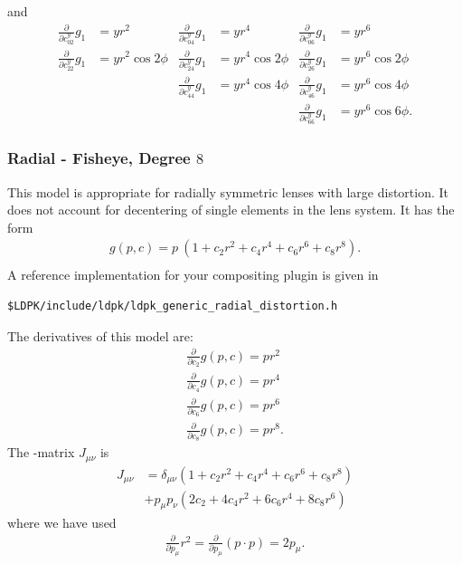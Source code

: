\documentclass[10pt,a4paper]{article}
\begin{document}
and
\begin{align}
\frac \partial {\partial c^y_{02}} g_1 &= y r^2 &
\frac \partial {\partial c^y_{04}} g_1 &= y r^4 &
\frac \partial {\partial c^y_{06}} g_1 &= y r^6 \nonumber\\
\frac \partial {\partial c^y_{22}} g_1 &= y r^2 \cos{2\phi} &
\frac \partial {\partial c^y_{24}} g_1 &= y r^4 \cos{2\phi} &
\frac \partial {\partial c^y_{26}} g_1 &= y r^6 \cos{2\phi} \nonumber\\
& & \frac \partial {\partial c^y_{44}} g_1 &= y r^4 \cos{4\phi} &
\frac \partial {\partial c^y_{46}} g_1 &= y r^6 \cos{4\phi} \nonumber\\
& & & & \frac \partial {\partial c^y_{66}} g_1 &= y r^6 \cos{6\phi}.
\end{align}

\subsubsection{Radial - Fisheye, Degree $8$}
This model is appropriate for radially symmetric lenses with large distortion.
It does not account for decentering of single elements in the lens system.
It has the form
\begin{align}
g(p,c) = p\ (1 + c_2 r^2 + c_4 r^4 + c_6 r^6 + c_8 r^8). \nonumber\\
\end{align}
A reference implementation for your compositing plugin is given in
\begin{verbatim}
$LDPK/include/ldpk/ldpk_generic_radial_distortion.h
\end{verbatim}
The derivatives of this model are:
\begin{align}
\frac \partial {\partial c_2} g(p,c) = pr^2 \nonumber\\
\frac \partial {\partial c_4} g(p,c) = pr^4 \nonumber\\
\frac \partial {\partial c_6} g(p,c) = pr^6 \nonumber\\
\frac \partial {\partial c_8} g(p,c) = pr^8.
\end{align}
The \Jacobi-matrix $J_{\mu\nu}$ is
\begin{align}
J_{\mu\nu}	&= \delta_{\mu\nu}(1 + c_2 r^2 + c_4 r^4 + c_6 r^6 + c_8 r^8) \nonumber\\
		&+ p_\mu p_\nu (2 c_2 + 4 c_4 r^2 + 6 c_6 r^4 + 8 c_8 r^6)
\end{align}
where we have used
\begin{align}
\frac \partial {\partial p_\mu} r^2 = \frac \partial {\partial p_\mu} (p\cdot p) = 2 p_\mu.
\end{align}
\end{document}
